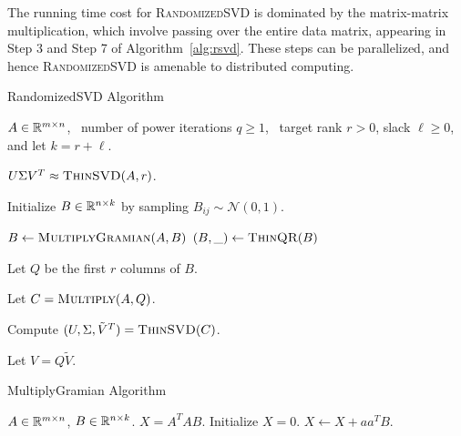 The running time cost for \textsc{RandomizedSVD} is dominated by the
matrix-matrix multiplication, which involve passing over the entire data
matrix, appearing in Step 3 and Step 7 of Algorithm~\ref{alg:rsvd}.  These
steps can be parallelized, and hence \textsc{RandomizedSVD} is amenable to
distributed computing.



\begin{algorithm}[tb]
 \caption{{\sc RandomizedSVD} Algorithm}
  \label{alg:rsvd}
  \begin{algorithmic}[1]
    \Require $A \in \mathbb{R}^{m\times n}$, \
      number of power iterations $q \ge 1$, \
      target rank $r > 0$, slack $\ell \ge 0$, and let $k=r+\ell$.

    \Ensure $U \Sigma V^T \approx \Call{ThinSVD}{A, r}$.

    \State Initialize $B \in \mathbb{R}^{n\times k}$ by sampling $B_{ij} \sim \mathcal{N}(0, 1)$.

    \For{$q$ times}
        \State $B \gets \Call{MultiplyGramian}{A, B}$
        \State $(B, \_) \gets \Call{ThinQR}{B}$
    \EndFor

    \State Let $Q$ be the first $r$ columns of $B$.

    \State Let $C = \Call{Multiply}{A, Q}$.

    \State Compute $(U, \Sigma, \tilde V^T) = \Call{ThinSVD}{C}$.

    \State Let $V = Q \tilde V$.

    \end{algorithmic}
\end{algorithm}

\begin{algorithm}[tb]
  \caption{{\sc MultiplyGramian} Algorithm}
  \label{alg:gram}
  \begin{algorithmic}[1]
    \Require $A \in \mathbb{R}^{m\times n}$, $B \in \mathbb{R}^{n\times k}$.
    \Ensure $X = A^T A B$.
    \State Initialize $X = 0$.
        \State $X \gets X + a a^T B$.
    \EndFor
  \end{algorithmic}
\end{algorithm}



